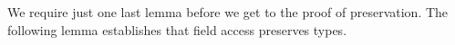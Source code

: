 \begin{fence}
\begin{code}
\AgdaOperator{\AgdaInductiveConstructor{,}}\AgdaSpace{}%
\AgdaSymbol{)}\AgdaSpace{}%
\AgdaSpace{}%
\AgdaSpace{}%
\AgdaSpace{}%
\AgdaSpace{}%
\AgdaSpace{}%
\AgdaSpace{}%
\AgdaSpace{}%
\AgdaSpace{}%
\AgdaSymbol{(}\AgdaSpace{}%
\AgdaSymbol{)}\AgdaSpace{}%
\AgdaSymbol{(}\AgdaSpace{}%
\AgdaSymbol{)}\AgdaSpace{}%
\AgdaSpace{}%
\<%
\\
%
\>[4]\AgdaSpace{}%
\AgdaSymbol{\{}\AgdaSymbol{\}}\AgdaSpace{}%
\AgdaSymbol{\{}\AgdaSymbol{\}}\AgdaSpace{}%
\AgdaSpace{}%
\AgdaSymbol{=}\AgdaSpace{}%
\<%
\\
%
\>[4]\AgdaSpace{}%
\AgdaSymbol{\{}\AgdaSymbol{\}}\AgdaSpace{}%
\AgdaSymbol{\{}\AgdaSpace{}%
\AgdaSymbol{\}}\AgdaSpace{}%
\AgdaSymbol{(}\AgdaSpace{}%
\AgdaSymbol{)}\AgdaSpace{}%
\AgdaSymbol{=}\AgdaSpace{}%
\AgdaSpace{}%
\<%
\end{code}
\end{fence}

We require just one last lemma before we get to the proof of
preservation. The following lemma establishes that field access
preserves types.

